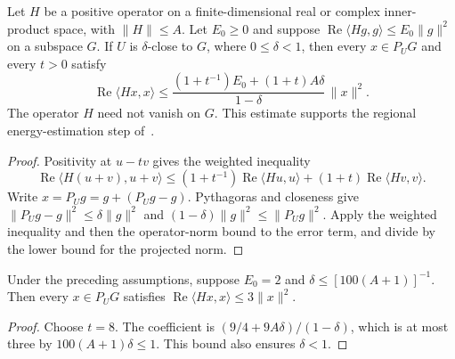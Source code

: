 \begin{lemma}
    \label{lem:projected_positive_energy}
    \leanok
    Let $H$ be a positive operator on a finite-dimensional real or complex
    inner-product space, with $\|H\|\le A$. Let $E_0\ge0$ and suppose
    $\operatorname{Re}\langle Hg,g\rangle\le E_0\|g\|^2$ on a subspace $G$.
    If $U$ is $\delta$-close to $G$, where $0\le\delta<1$, then every
    $x\in P_U G$ and every $t>0$ satisfy
    \[
        \operatorname{Re}\langle Hx,x\rangle\le
        \frac{(1+t^{-1})E_0+(1+t)A\delta}{1-\delta}\,\|x\|^2.
    \]
    The operator $H$ need not vanish on $G$. This estimate supports
    the regional energy-estimation step of~\cite{Arad2016RigorousRG}.
\end{lemma}
\begin{proof}\leanok
    Positivity at $u-tv$ gives the weighted inequality
    \[
        \operatorname{Re}\langle H(u+v),u+v\rangle
        \le(1+t^{-1})\operatorname{Re}\langle Hu,u\rangle
        +(1+t)\operatorname{Re}\langle Hv,v\rangle.
    \]
    Write $x=P_Ug=g+(P_Ug-g)$. Pythagoras and closeness give
    $\|P_Ug-g\|^2\le\delta\|g\|^2$ and
    $(1-\delta)\|g\|^2\le\|P_Ug\|^2$.
    Apply the weighted inequality and then the operator-norm bound to
    the error term, and divide by the lower bound for the projected norm.
\end{proof}

\begin{lemma}
    \label{lem:projected_positive_energy_three}
    \leanok
    Under the preceding assumptions, suppose $E_0=2$ and
    $\delta\le[100(A+1)]^{-1}$. Then every $x\in P_U G$ satisfies
    $\operatorname{Re}\langle Hx,x\rangle\le3\|x\|^2$.
\end{lemma}
\begin{proof}\leanok
    Choose $t=8$. The coefficient is
    $(9/4+9A\delta)/(1-\delta)$, which is at most three by
    $100(A+1)\delta\le1$. This bound also ensures $\delta<1$.
\end{proof}

